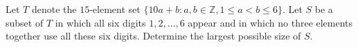 Let $T$ denote the $15$-element set $\{10a+b:a,b\in\mathbb{Z},1\le a<b\le 6\}$. Let $S$ be a subset of $T$ in which all six digits $1,2,\ldots ,6$ appear and in which no three elements together use all these six digits. Determine the largest possible size of $S$.